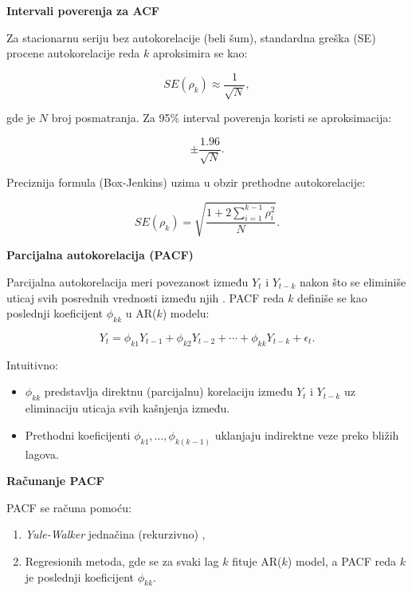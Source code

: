 \documentclass[12pt]{article}
\begin{document}
\bigskip

\noindent \textbf{Intervali poverenja za ACF}

Za stacionarnu seriju bez autokorelacije (beli šum), standardna greška (SE) procene autokorelacije reda $k$ aproksimira se kao:

\[
SE(\rho_k) \approx \frac{1}{\sqrt{N}},
\]

gde je $N$ broj posmatranja. Za 95\% interval poverenja koristi se aproksimacija:

\[
\pm \frac{1.96}{\sqrt{N}}.
\]

Preciznija formula (Box-Jenkins) uzima u obzir prethodne autokorelacije:

\[
SE(\rho_k) = \sqrt{\frac{1 + 2 \sum_{i=1}^{k-1} \rho_i^2}{N}}.
\]

\bigskip

\noindent \textbf{Parcijalna autokorelacija (PACF)}

Parcijalna autokorelacija meri povezanost između $Y_t$ i $Y_{t-k}$ nakon što se eliminiše uticaj svih posrednih vrednosti između njih \cite{brockwell2002, hamilton1994}. PACF reda $k$ definiše se kao poslednji koeficijent $\phi_{kk}$ u AR($k$) modelu:

\[
Y_t = \phi_{k1} Y_{t-1}
     + \phi_{k2} Y_{t-2}
     + \cdots
     + \phi_{kk} Y_{t-k}
     + \epsilon_t.
\]

Intuitivno:

\begin{itemize}
    \item $\phi_{kk}$ predstavlja direktnu (parcijalnu) korelaciju između $Y_t$ i $Y_{t-k}$ uz eliminaciju uticaja svih kašnjenja između.
    \item Prethodni koeficijenti $\phi_{k1}, \ldots, \phi_{k(k-1)}$ uklanjaju indirektne veze preko bližih lagova.
\end{itemize}

\bigskip

\noindent \textbf{Računanje PACF}

PACF se računa pomoću:

\begin{enumerate}
    \item \textit{Yule-Walker} jednačina (rekurzivno) \cite{brockwell2002},
    \item Regresionih metoda, gde se za svaki lag $k$ fituje AR($k$) model, a PACF reda $k$ je poslednji koeficijent $\phi_{kk}$.
\end{enumerate}

\bigskip
\end{document}

